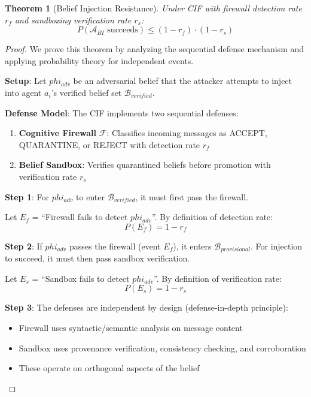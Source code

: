 \documentclass[
]{article}
\newtheorem{theorem}{Theorem}[section]
\begin{document}
\begin{theorem}[Belief Injection Resistance]
\label{thm:belief-injection}
Under CIF with firewall detection rate $r_f$ and sandboxing verification rate $r_s$:
\begin{equation}
\label{eq:belief-injection-bound}
P(\mathcal{A}_{BI} \text{ succeeds}) \leq (1 - r_f) \cdot (1 - r_s)
\end{equation}
\end{theorem}

\begin{proof}
We prove this theorem by analyzing the sequential defense mechanism and applying probability theory for independent events.

\textbf{Setup}: Let $phi_{adv}$ be an adversarial belief that the attacker attempts to inject into agent $a_i$'s verified belief set $\mathcal{B}_{verified}$.

\textbf{Defense Model}: The CIF implements two sequential defenses:
\begin{enumerate}
\item \textbf{Cognitive Firewall} $\mathcal{F}$: Classifies incoming messages as ACCEPT, QUARANTINE, or REJECT with detection rate $r_f$
\item \textbf{Belief Sandbox}: Verifies quarantined beliefs before promotion with verification rate $r_s$
\end{enumerate}

\textbf{Step 1}: For $phi_{adv}$ to enter $\mathcal{B}_{verified}$, it must first pass the firewall.

Let $E_f$ = ``Firewall fails to detect $phi_{adv}$''. By definition of detection rate:
\begin{equation}
\label{eq:firewall-evasion}
P(E_f) = 1 - r_f
\end{equation}

\textbf{Step 2}: If $phi_{adv}$ passes the firewall (event $E_f$), it enters $\mathcal{B}_{provisional}$. For injection to succeed, it must then pass sandbox verification.

Let $E_s$ = ``Sandbox fails to detect $phi_{adv}$''. By definition of verification rate:
\begin{equation}
\label{eq:sandbox-evasion}
P(E_s) = 1 - r_s
\end{equation}

\textbf{Step 3}: The defenses are independent by design (defense-in-depth principle):
\begin{itemize}
\item Firewall uses syntactic/semantic analysis on message content
\item Sandbox uses provenance verification, consistency checking, and corroboration
\item These operate on orthogonal aspects of the belief
\end{itemize}


\end{proof}
\end{document}
